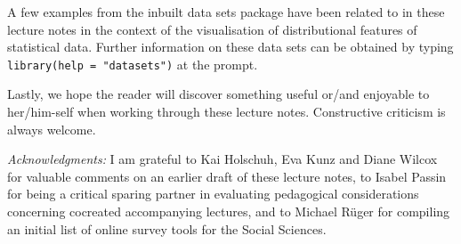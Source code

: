 \medskip
\noindent
A few examples from the inbuilt \R{} data sets package have
been related to in these lecture notes in the context of the
visualisation of distributional features of statistical data.
Further information on these data sets can be obtained by typing
\texttt{library(help = "datasets")} at the \R{} prompt.

\medskip
\noindent
Lastly, we hope the reader will discover something useful or/and
enjoyable to her/him-self when working through these lecture
notes. Constructive criticism is always welcome.

\vfill
\medskip
\noindent
\textit{Acknowledgments:} I am grateful to Kai Holschuh, Eva 
Kunz and Diane Wilcox for valuable comments on an earlier draft of 
these lecture notes, to Isabel Passin for being a critical sparing
partner in evaluating pedagogical considerations concerning
cocreated accompanying lectures, and to Michael R\"{u}ger for
compiling an initial list of online survey tools for the Social
Sciences.

